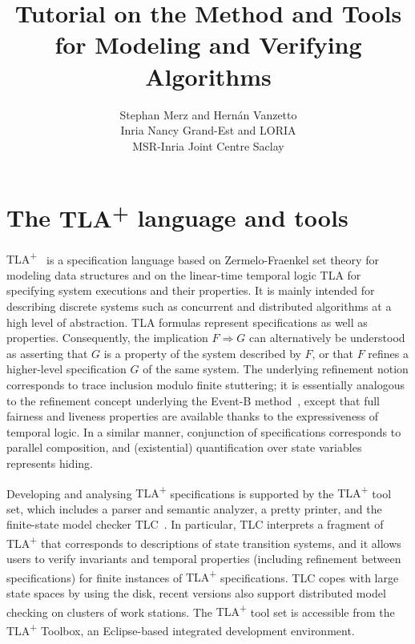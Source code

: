 \documentclass[a4paper]{article}
\title{
  Tutorial on the \tlaplus{} Method and Tools\\
  for Modeling and Verifying Algorithms
}
\author{
  Stephan Merz and Hernán Vanzetto\\
  Inria Nancy Grand-Est and LORIA\\
  MSR-Inria Joint Centre Saclay
}
\date{}
\newcommand{\tlaplus}{{\upshape TLA\textsuperscript{+}}}
\newcommand{\implies}{\ensuremath{\Rightarrow}}
\begin{document}
\maketitle

\section{The \tlaplus{} language and tools}

\tlaplus~\cite{lamport:tlabook,merz:tlabook} is a specification language based
on Zermelo-Fraenkel set theory for modeling data structures and on the
linear-time temporal logic TLA for specifying system executions and their
properties. It is mainly intended for describing discrete systems such as
concurrent and distributed algorithms at a high level of abstraction. TLA
formulas represent specifications as well as properties. Consequently, the
implication $F \implies G$ can alternatively be understood as asserting that $G$
is a property of the system described by $F$, or that $F$ refines a higher-level
specification $G$ of the same system. The underlying refinement notion
corresponds to trace inclusion modulo finite stuttering; it is essentially
analogous to the refinement concept underlying the Event-B
method~\cite{abrial:event-b}, except that full fairness and liveness properties
are available thanks to the expressiveness of temporal logic. In a similar
manner, conjunction of specifications corresponds to parallel composition, and
(existential) quantification over state variables represents hiding.

Developing and analysing \tlaplus{} specifications is supported by the
\tlaplus{} tool set, which includes a parser and semantic analyzer, a pretty
printer, and the finite-state model checker TLC~\cite{yu:model-checking}. In
particular, TLC interprets a fragment of \tlaplus{} that corresponds to
descriptions of state transition systems, and it allows users to verify
invariants and temporal properties (including refinement between specifications)
for finite instances of \tlaplus{} specifications. TLC copes with large state
spaces by using the disk, recent versions also support distributed model
checking on clusters of work stations. The \tlaplus{} tool set is accessible
from the \tlaplus{} Toolbox, an Eclipse-based integrated development
environment.
\end{document}
